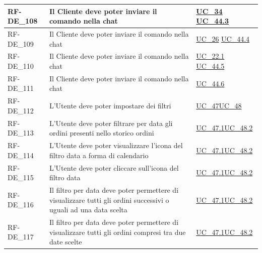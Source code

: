 \begin{longtable}{|>{\raggedright}p{}|>{\raggedright\arraybackslash}p{}|>{\raggedright\arraybackslash}p{}|}
	\hline
	RF-DE\_108 \hypertarget{rf-de_108} & Il Cliente deve poter inviare il comando \vr{/duplica\{xx\}} nella chat & \hyperref[uc_34]{UC\_34} \newline\hyperref[uc_44.3]{UC\_44.3} \\
	\hline
	RF-DE\_109 \hypertarget{rf-de_109} & Il Cliente deve poter inviare il comando \vr{/invia} nella chat & \hyperref[uc_26]{UC\_26} \newline \hyperref[uc_44.4]{UC\_44.4} \\
	\hline
	RF-DE\_110 \hypertarget{rf-de_110} & Il Cliente deve poter inviare il comando \vr{/annulla} nella chat & \hyperref[uc_22.1]{UC\_22.1} \newline \hyperref[uc_44.5]{UC\_44.5} \\
	\hline
	RF-DE\_111 \hypertarget{rf-de_111} & Il Cliente deve poter inviare il comando \vr{/comandi} nella chat & \hyperref[uc_44.6]{UC\_44.6} \\
	\hline
	RF-DE\_112 \hypertarget{rf-de_112} & L'Utente deve poter impostare dei filtri & \hyperref[uc_47]{UC\_47}\newline \hyperref[uc_48]{UC\_48} \\
	\hline
	RF-DE\_113 \hypertarget{rf-de_113} & L'Utente deve poter filtrare per data gli ordini presenti nello storico ordini & \hyperref[uc_47.1]{UC\_47.1}\newline \hyperref[uc_48.2]{UC\_48.2} \\
	\hline
	RF-DE\_114 \hypertarget{rf-de_114} & L'Utente deve poter visualizzare l'icona del filtro data a forma di calendario & \hyperref[uc_47.1]{UC\_47.1}\newline \hyperref[uc_48.2]{UC\_48.2} \\
	\hline
	RF-DE\_115 \hypertarget{rf-de_115} & L'Utente deve poter cliccare sull'icona del filtro data & \hyperref[uc_47.1]{UC\_47.1}\newline \hyperref[uc_48.2]{UC\_48.2} \\
	\hline
	RF-DE\_116 \hypertarget{rf-de_116} & Il filtro per data deve poter permettere di visualizzare tutti gli ordini successivi o uguali ad una data scelta & \hyperref[uc_47.1]{UC\_47.1}\newline \hyperref[uc_48.2]{UC\_48.2} \\
	\hline
	RF-DE\_117 \hypertarget{rf-de_117} & Il filtro per data deve poter permettere di visualizzare tutti gli ordini compresi tra due date scelte & \hyperref[uc_47.1]{UC\_47.1}\newline \hyperref[uc_48.2]{UC\_48.2} \\

\end{longtable}
